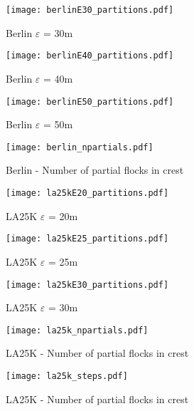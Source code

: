 \documentclass[a4paper,10pt]{article}
\begin{document}
\begin{figure}[h!]
 \centering
 \texttt{[image: berlinE30\_partitions.pdf]}
 \caption{Berlin $\varepsilon$ = 30m}
 \label{fig:berlin30}
\end{figure}

\begin{figure}[h!]
 \centering
 \texttt{[image: berlinE40\_partitions.pdf]}
 \caption{Berlin $\varepsilon$ = 40m}
 \label{fig:berlin40}
\end{figure}

\begin{figure}[h!]
 \centering
 \texttt{[image: berlinE50\_partitions.pdf]}
 \caption{Berlin $\varepsilon$ = 50m}
 \label{fig:berlin50}
\end{figure}

\begin{figure}[h!]
 \centering
 \texttt{[image: berlin\_npartials.pdf]}
 \caption{Berlin - Number of partial flocks in crest}
 \label{fig:berlin_npartials}
\end{figure}



\begin{figure}[h!]
 \centering
 \texttt{[image: la25kE20\_partitions.pdf]}
 \caption{LA25K $\varepsilon$ = 20m}
 \label{fig:la25k20}
\end{figure}

\begin{figure}[h!]
 \centering
 \texttt{[image: la25kE25\_partitions.pdf]}
 \caption{LA25K $\varepsilon$ = 25m}
 \label{fig:la25k25}
\end{figure}

\begin{figure}[h!]
 \centering
 \texttt{[image: la25kE30\_partitions.pdf]}
 \caption{LA25K $\varepsilon$ = 30m}
 \label{fig:la25k30}
\end{figure}

\begin{figure}[h!]
 \centering
 \texttt{[image: la25k\_npartials.pdf]}
 \caption{LA25K - Number of partial flocks in crest}
 \label{fig:la25k_partials}
\end{figure}

\begin{figure}[h!]
 \centering
 \texttt{[image: la25k\_steps.pdf]}
 \caption{LA25K - Number of partial flocks in crest}
 \label{fig:la25k_steps}
\end{figure}
\end{document}
